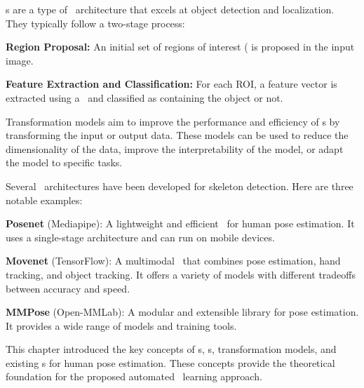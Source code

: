 \RCNN\-s  are a type of \NN\ architecture that excels at object detection and localization. They typically follow a two-stage process:

\startitemize[1]
    \item {\bf Region Proposal:} An initial set of regions of interest  (\ROI\) is proposed in the input image.
    \item {\bf Feature Extraction and Classification:} For each ROI, a feature vector is extracted using a \CNN\ and classified as containing the object or not.
\stopitemize

Transformation models aim to improve the performance and efficiency of \NN\-s by transforming the input or output data. These models can be used to reduce the dimensionality of the data, improve the interpretability of the model, or adapt the model to specific tasks.

Several \NN\ architectures have been developed for skeleton detection. Here are three notable examples:

\startitemize[n]
    \item {\bf Posenet} (Mediapipe): A lightweight and efficient \NN\ for human pose estimation. It uses a single-stage architecture and can run on mobile devices.
    \item {\bf Movenet} (TensorFlow): A multimodal \NN\ that combines pose estimation, hand tracking, and object tracking. It offers a variety of models with different tradeoffs between accuracy and speed.
    \item {\bf MMPose} (Open-MMLab): A modular and extensible library for pose estimation. It provides a wide range of models and training tools.
\stopitemize

This chapter introduced the key concepts of \NN\-s, \RCNN\-s, transformation models, and existing \NN\-s for human pose estimation. These concepts provide the theoretical foundation for the proposed automated \NN\ learning approach.


